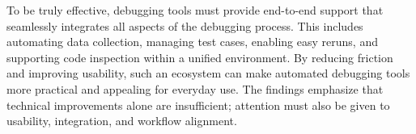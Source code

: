 To be truly effective, debugging tools must provide end-to-end support that seamlessly integrates all aspects of the debugging process. This includes automating data collection, managing test cases, enabling easy reruns, and supporting code inspection within a unified environment. By reducing friction and improving usability, such an ecosystem can make automated debugging tools more practical and appealing for everyday use. The findings emphasize that technical improvements alone are insufficient; attention must also be given to usability, integration, and workflow alignment.